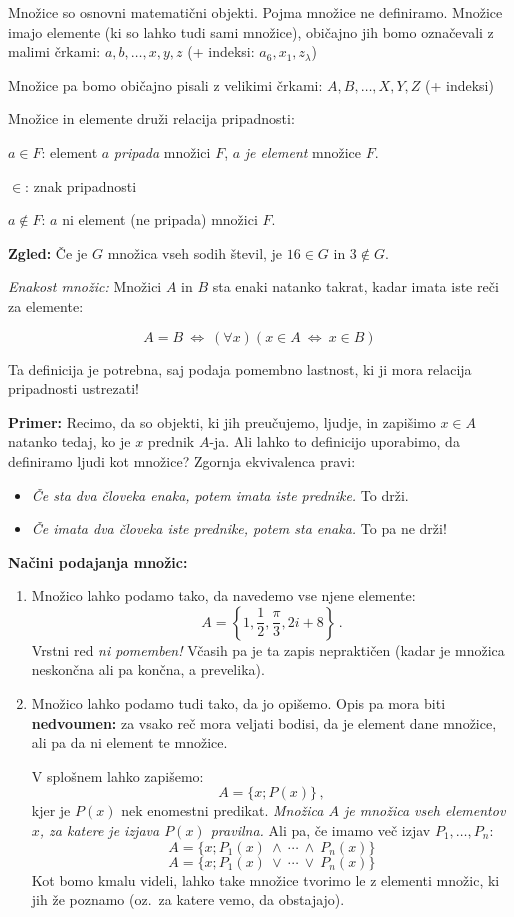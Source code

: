 \documentclass[11pt,paper=b5,DIV=13,headinclude,footinclude]{scrbook}
\def\ali {{~\vee~}}
\def\inn {{~\wedge~}}
\def\cee {{~\Leftrightarrow~}}
\begin{document}
{
\indent Množice so osnovni matematični objekti. Pojma množice ne definiramo.
Množice imajo elemente (ki so lahko tudi sami množice), običajno jih bomo označevali z malimi črkami:
$a,b,\ldots, x,y,z$ (+ indeksi: $a_6, x_1, z_\lambda$)

\smallskip

Množice pa bomo običajno pisali z velikimi črkami: $A,B,\ldots, X,Y,Z$ (+ indeksi)

\smallskip
Množice in elemente druži relacija pripadnosti:

$a\in F$: element $a$ \emph{ pripada} množici $F$, $a$ \emph{ je element} množice $F$.

\smallskip

$\in$: znak pripadnosti

\smallskip
$a\not\in F$: $a$ ni element (ne pripada) množici $F$.

\smallskip

\textbf{ Zgled:}
Če je $G$ množica vseh sodih števil, je $16\in G$ in $3\not\in G$.


\medskip
{\em Enakost množic:} Množici $A$ in $B$ sta enaki natanko takrat, kadar imata iste reči za elemente:

$$A = B \cee (\forall x) (x\in A\cee x\in B)$$

\medskip
Ta definicija je potrebna, saj podaja pomembno lastnost, ki ji mora relacija pripadnosti ustrezati!

\textbf{ Primer:} Recimo, da so objekti, ki jih preučujemo, ljudje,
in zapišimo $x\in A$ natanko tedaj, ko je $x$ prednik $A$-ja.
Ali lahko to definicijo uporabimo, da definiramo ljudi kot množice?
Zgornja ekvivalenca pravi:
\begin{itemize}
  \item {\em Če sta dva človeka enaka, potem imata iste prednike.} To drži.
  \item {\em Če imata dva človeka iste prednike, potem sta enaka.} To pa ne drži!
\end{itemize}

\noindent\textbf{ Načini podajanja množic:}
\begin{enumerate}
  \item Množico lahko podamo tako, da navedemo vse njene elemente:
$$A = \left\{1,\frac{1}{2}, \frac{\pi}{3}, 2i+8\right\}\,.$$
Vrstni red {\em ni pomemben!}
Včasih pa je ta zapis nepraktičen (kadar je množica neskončna ali pa končna, a prevelika).
  \item Množico lahko podamo tudi tako, da jo opišemo. Opis pa mora biti \textbf{ nedvoumen:}
za vsako reč mora veljati bodisi, da je element dane množice, ali pa da ni element te množice.

V splošnem lahko zapišemo:
$$A = \{x; P(x)\}\,,$$
kjer je $P(x)$ nek enomestni predikat.
{\em Množica $A$ je množica vseh elementov $x$, za katere je izjava $P(x)$ pravilna.}
Ali pa, če imamo več izjav $P_1,\ldots, P_n$:
$$A = \{x; P_1(x)\inn \cdots\inn P_n(x)\}$$
$$A = \{x; P_1(x)\ali \cdots\ali P_n(x)\}$$
Kot bomo kmalu videli, lahko take množice tvorimo le z elementi množic, ki jih že poznamo (oz.~za katere vemo, da obstajajo).
\end{enumerate}
}
\end{document}
